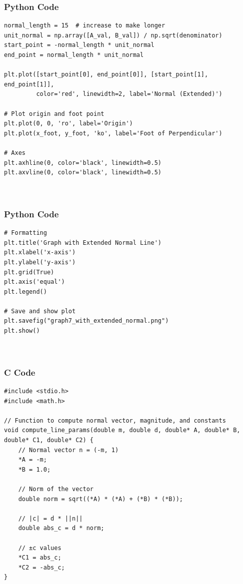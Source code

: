 \documentclass{beamer}
\begin{document}
\begin{frame}[fragile]
    \frametitle{Python Code}

    \begin{lstlisting}
normal_length = 15  # increase to make longer
unit_normal = np.array([A_val, B_val]) / np.sqrt(denominator)
start_point = -normal_length * unit_normal
end_point = normal_length * unit_normal

plt.plot([start_point[0], end_point[0]], [start_point[1], end_point[1]],
         color='red', linewidth=2, label='Normal (Extended)')

# Plot origin and foot point
plt.plot(0, 0, 'ro', label='Origin')
plt.plot(x_foot, y_foot, 'ko', label='Foot of Perpendicular')

# Axes
plt.axhline(0, color='black', linewidth=0.5)
plt.axvline(0, color='black', linewidth=0.5)



  \end{lstlisting}
\end{frame}
\begin{frame}[fragile]
    \frametitle{Python Code}

    \begin{lstlisting}
# Formatting
plt.title('Graph with Extended Normal Line')
plt.xlabel('x-axis')
plt.ylabel('y-axis')
plt.grid(True)
plt.axis('equal')
plt.legend()

# Save and show plot
plt.savefig("graph7_with_extended_normal.png")
plt.show()



  \end{lstlisting}
\end{frame}
\begin{frame}[fragile]
\frametitle{C Code}
\begin{lstlisting}
#include <stdio.h>
#include <math.h>

// Function to compute normal vector, magnitude, and constants
void compute_line_params(double m, double d, double* A, double* B, double* C1, double* C2) {
    // Normal vector n = (-m, 1)
    *A = -m;
    *B = 1.0;

    // Norm of the vector
    double norm = sqrt((*A) * (*A) + (*B) * (*B));

    // |c| = d * ||n||
    double abs_c = d * norm;

    // ±c values
    *C1 = abs_c;
    *C2 = -abs_c;
}

    \end{lstlisting}

\end{frame}
\end{document}
